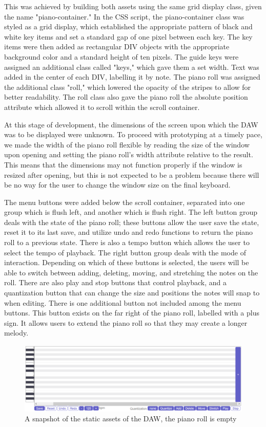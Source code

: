 This was achieved by building both assets using the same grid display class, given the name
"piano-container." In the CSS script, the piano-container class was styled as a grid display,
which established the appropriate pattern of black and white key items and set a standard gap of
one pixel between each key. The key items were then added as rectangular DIV objects with the
appropriate background color and a standard height of ten pixels. The guide keys were assigned an
additional class called "keys," which gave them a set width. Text was added in the center of each
DIV, labelling it by note. The piano roll was assigned the additional class "roll," which lowered
the opacity of the stripes to allow for better readability. The roll class also gave the piano roll
the absolute position attribute which allowed it to scroll within the scroll container.

At this stage of development, the dimensions of the screen upon which the DAW was to be displayed
were unknown. To proceed with prototyping at a timely pace, we made the width of the piano roll
flexible by reading the size of the window upon opening and setting the piano roll's width
attribute relative to the result. This means that the dimensions may not function properly if the
window is resized after opening, but this is not expected to be a problem because there will be
no way for the user to change the window size on the final keyboard.

The menu buttons were added below the scroll container, separated into one group which is flush
left, and another which is flush right. The left button group deals with the state of the piano
roll; these buttons allow the user save the state, reset it to its last save, and utilize undo and
redo functions to return the piano roll to a previous state. There is also a tempo button which
allows the user to select the tempo of playback. The right button group deals with the mode of
interaction. Depending on which of these buttons is selected, the users will be able to switch
between adding, deleting, moving, and stretching the notes on the roll. There are also play and
stop buttons that control playback, and a quantization button that can change the size and
positions the notes will snap to when editing. There is one additional button not included among
the menu buttons. This button exists on the far right of the piano roll, labelled with a plus sign.
It allows users to extend the piano roll so that they may create a longer melody.

\begin{figure}[h!]
  \centering
  \includegraphics[width=\linewidth]{image/Static.png}
  \caption{A snapshot of the static assets of the DAW, the piano roll is empty}
  \label{fig:static}
\end{figure}

